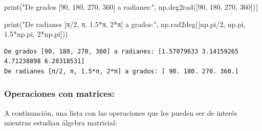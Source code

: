 \documentclass[
  letterpaper,
  DIV=11,
  numbers=noendperiod]{scrreprt}
\newenvironment{Shaded}{\begin{snugshade}}{\end{snugshade}}
\newcommand{\BuiltInTok}[1]{\textcolor[rgb]{0.00,0.23,0.31}{#1}}
\newcommand{\DecValTok}[1]{\textcolor[rgb]{0.68,0.00,0.00}{#1}}
\newcommand{\FloatTok}[1]{\textcolor[rgb]{0.68,0.00,0.00}{#1}}
\newcommand{\NormalTok}[1]{\textcolor[rgb]{0.00,0.23,0.31}{#1}}
\newcommand{\OperatorTok}[1]{\textcolor[rgb]{0.37,0.37,0.37}{#1}}
\newcommand{\StringTok}[1]{\textcolor[rgb]{0.13,0.47,0.30}{#1}}
\begin{document}
\begin{tcolorbox}
\begin{Shaded}
\begin{Highlighting}[]
\BuiltInTok{print}\NormalTok{(}\StringTok{"De grados [90, 180, 270, 360] a radianes:"}\NormalTok{, }
\NormalTok{      np.deg2rad([}\DecValTok{90}\NormalTok{, }\DecValTok{180}\NormalTok{, }\DecValTok{270}\NormalTok{, }\DecValTok{360}\NormalTok{]))}

\BuiltInTok{print}\NormalTok{(}\StringTok{"De radianes [π/2, π, 1.5*π, 2*π] a grados:"}\NormalTok{, }
\NormalTok{      np.rad2deg([np.pi}\OperatorTok{/}\DecValTok{2}\NormalTok{, np.pi, }\FloatTok{1.5}\OperatorTok{*}\NormalTok{np.pi, }\DecValTok{2}\OperatorTok{*}\NormalTok{np.pi]))}
\end{Highlighting}
\end{Shaded}

\begin{verbatim}
De grados [90, 180, 270, 360] a radianes: [1.57079633 3.14159265 4.71238898 6.28318531]
De radianes [π/2, π, 1.5*π, 2*π] a grados: [ 90. 180. 270. 360.]
\end{verbatim}

\end{tcolorbox}

\subsubsection{Operaciones con
matrices:}\label{operaciones-con-matrices}

A continuación, una lista con las operaciones que les pueden ser de
interés mientras estudian álgebra matricial:
\end{document}
